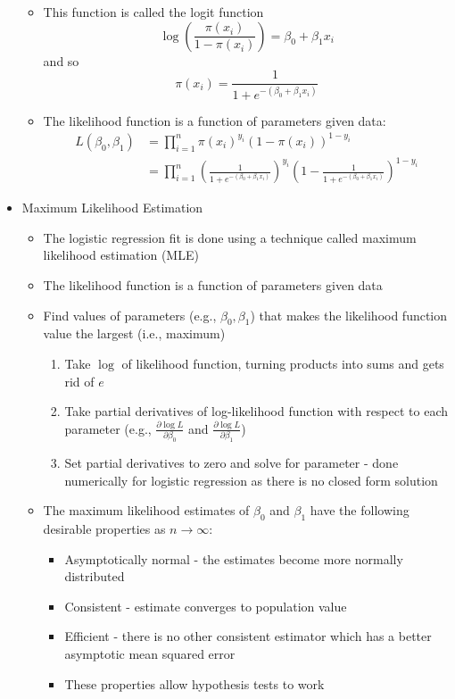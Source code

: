 \documentclass[12pt]{article}
\begin{document}
\begin{itemize}
\begin{itemize}
\item This function is called the logit function $$ \log \left( \frac{\pi(x_i)}{1-\pi(x_i)} \right) = \beta_0 + \beta_1x_i $$ and so $$ \pi(x_i) = \frac{1}{1 + e^{-(\beta_0 + \beta_1x_i)}} $$ 
\item The likelihood function is a function of parameters given data: $$ \begin{aligned} L(\beta_0,\beta_1) &= \prod_{i=1}^n \pi(x_i)^{y_i}(1-\pi(x_i))^{1-y_i} \\ &= \prod_{i=1}^n \left( \frac{1}{1 + e^{-(\beta_0 + \beta_1x_i)}} \right)^{y_i} \left(1 - \frac{1}{1 + e^{-(\beta_0 + \beta_1x_i)}} \right)^{1-y_i} \end{aligned} $$ \end{itemize} 
\item Maximum Likelihood Estimation \begin{itemize}
\item The logistic regression fit is done using a technique called maximum likelihood estimation (MLE)
\item The likelihood function is a function of parameters given data 
\item Find values of parameters (e.g., $\beta_0,\beta_1$) that makes the likelihood function value the largest (i.e., maximum) \begin{enumerate} 
\item Take $\log$ of likelihood function, turning products into sums and gets rid of $e$
\item Take partial derivatives of log-likelihood function with respect to each parameter (e.g., $\frac{\partial \log L}{\partial \beta_0}$ and $\frac{\partial \log L}{\partial \beta_1}$) 
\item Set partial derivatives to zero and solve for parameter - done numerically for logistic regression as there is no closed form solution 
\end{enumerate}
\item The maximum likelihood estimates of $\beta_0$ and $\beta_1$ have the following desirable properties as $n\to\infty$: \begin{itemize} 
\item Asymptotically normal - the estimates become more normally distributed 
\item Consistent - estimate converges to population value 
\item Efficient - there is no other consistent estimator which has a better asymptotic mean squared error 
\item These properties allow hypothesis tests to work 

\end{itemize}
\end{itemize}
\end{itemize}
\end{document}
